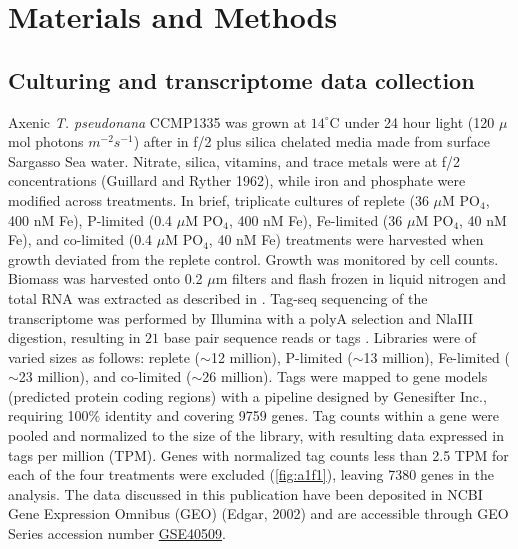 \section{Materials and Methods}
\subsection{Culturing and transcriptome data collection} 
Axenic \textit{T. pseudonana} CCMP1335 was grown at $14^{\circ}$C under 24 hour light (120 $\mu$mol photons $m^{-2} s^{-1}$) after \citet{Dyhrman2012} in f/2 plus silica chelated media made from surface Sargasso Sea water. Nitrate, silica, vitamins, and trace metals were at f/2 concentrations (Guillard and Ryther 1962), while iron and phosphate were modified across treatments. In brief, triplicate cultures of replete (36 $\mu$M PO$_{4}$, 400 nM Fe), P-limited (0.4 $\mu$M PO$_{4}$, 400 nM Fe), Fe-limited (36 $\mu$M PO$_{4}$, 40 nM Fe), and co-limited (0.4 $\mu$M PO$_{4}$, 40 nM Fe) treatments were harvested when growth deviated from the replete control. Growth was monitored by cell counts. Biomass was harvested onto 0.2 $\mu$m filters and flash frozen in liquid nitrogen and total RNA was extracted as described in \citep{Dyhrman2012}. Tag-seq sequencing of the transcriptome was performed by Illumina with a polyA selection and NlaIII digestion, resulting in $21$ base pair sequence reads or tags \citep{Dyhrman2012}. Libraries were of varied sizes as follows: replete ($\sim$12 million), P-limited ($\sim$13 million), Fe-limited ($\sim$23 million), and co-limited ($\sim$26 million). Tags were mapped to gene models (predicted protein coding regions) with a pipeline designed by Genesifter Inc., requiring 100\% identity and covering 9759 genes. Tag counts within a gene were pooled and normalized to the size of the library, with resulting data expressed in tags per million (TPM). Genes with normalized tag counts less than 2.5 TPM for each of the four treatments were excluded (\cref{fig:a1f1}), leaving 7380 genes in the analysis. The data discussed in this publication have been deposited in NCBI Gene Expression Omnibus (GEO) (Edgar, 2002) and are accessible through GEO Series accession number \href{http://www.ncbi.nlm.nih.gov/geo/query/acc.cgi?acc=GSE40509}{GSE40509}.  

